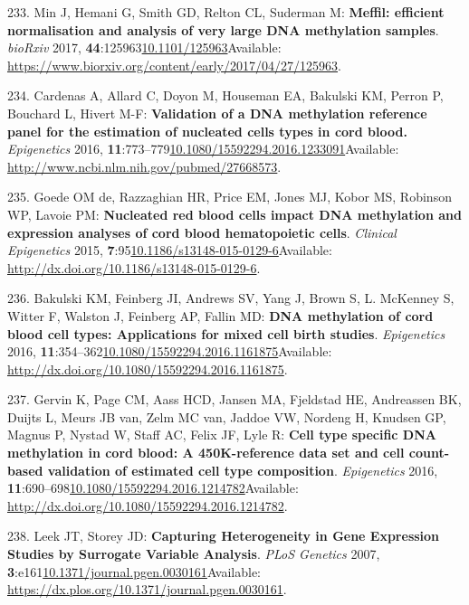 \documentclass[
]{book}
\begin{document}
\leavevmode\hypertarget{ref-Min2017}{}%
233. Min J, Hemani G, Smith GD, Relton CL, Suderman M: \textbf{Meffil: efficient normalisation and analysis of very large DNA methylation samples}. \emph{bioRxiv} 2017, \textbf{44}:125963\href{https://doi.org/10.1101/125963}{10.1101/125963}Available: \url{https://www.biorxiv.org/content/early/2017/04/27/125963}.

\leavevmode\hypertarget{ref-Cardenas2016}{}%
234. Cardenas A, Allard C, Doyon M, Houseman EA, Bakulski KM, Perron P, Bouchard L, Hivert M-F: \textbf{Validation of a DNA methylation reference panel for the estimation of nucleated cells types in cord blood.} \emph{Epigenetics} 2016, \textbf{11}:773--779\href{https://doi.org/10.1080/15592294.2016.1233091}{10.1080/15592294.2016.1233091}Available: \url{http://www.ncbi.nlm.nih.gov/pubmed/27668573}.

\leavevmode\hypertarget{ref-DeGoede2015}{}%
235. Goede OM de, Razzaghian HR, Price EM, Jones MJ, Kobor MS, Robinson WP, Lavoie PM: \textbf{Nucleated red blood cells impact DNA methylation and expression analyses of cord blood hematopoietic cells}. \emph{Clinical Epigenetics} 2015, \textbf{7}:95\href{https://doi.org/10.1186/s13148-015-0129-6}{10.1186/s13148-015-0129-6}Available: \url{http://dx.doi.org/10.1186/s13148-015-0129-6}.

\leavevmode\hypertarget{ref-Bakulski2016}{}%
236. Bakulski KM, Feinberg JI, Andrews SV, Yang J, Brown S, L. McKenney S, Witter F, Walston J, Feinberg AP, Fallin MD: \textbf{DNA methylation of cord blood cell types: Applications for mixed cell birth studies}. \emph{Epigenetics} 2016, \textbf{11}:354--362\href{https://doi.org/10.1080/15592294.2016.1161875}{10.1080/15592294.2016.1161875}Available: \url{http://dx.doi.org/10.1080/15592294.2016.1161875}.

\leavevmode\hypertarget{ref-Gervin2016}{}%
237. Gervin K, Page CM, Aass HCD, Jansen MA, Fjeldstad HE, Andreassen BK, Duijts L, Meurs JB van, Zelm MC van, Jaddoe VW, Nordeng H, Knudsen GP, Magnus P, Nystad W, Staff AC, Felix JF, Lyle R: \textbf{Cell type specific DNA methylation in cord blood: A 450K-reference data set and cell count-based validation of estimated cell type composition}. \emph{Epigenetics} 2016, \textbf{11}:690--698\href{https://doi.org/10.1080/15592294.2016.1214782}{10.1080/15592294.2016.1214782}Available: \url{http://dx.doi.org/10.1080/15592294.2016.1214782}.

\leavevmode\hypertarget{ref-Leek2007}{}%
238. Leek JT, Storey JD: \textbf{Capturing Heterogeneity in Gene Expression Studies by Surrogate Variable Analysis}. \emph{PLoS Genetics} 2007, \textbf{3}:e161\href{https://doi.org/10.1371/journal.pgen.0030161}{10.1371/journal.pgen.0030161}Available: \url{https://dx.plos.org/10.1371/journal.pgen.0030161}.
\end{document}
